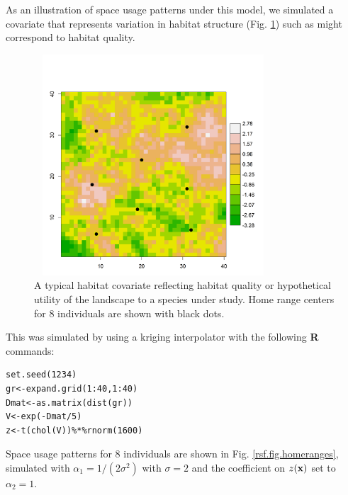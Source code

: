 As an illustration of space usage patterns under this model, we
simulated a covariate that represents variation in habitat structure
(Fig. \ref{rsf.fig.habitat}) such as might correspond to habitat
quality.
\begin{figure}
\centering
\includegraphics[width=3.5in,height=3.25in]{Ch10-RSF/figs/habitat.png}
\caption{A typical habitat covariate reflecting habitat quality or
  hypothetical utility of the landscape to a species under study. Home range centers for 8 individuals are
shown with black dots.}
\label{rsf.fig.habitat}
\end{figure}
This was simulated by using a
kriging interpolator with the following {\bf R} commands:
\begin{verbatim}
set.seed(1234)
gr<-expand.grid(1:40,1:40)
Dmat<-as.matrix(dist(gr))
V<-exp(-Dmat/5)
z<-t(chol(V))%*%rnorm(1600)
\end{verbatim}
Space usage patterns for
 8 individuals are shown in Fig. \ref{rsf.fig.homeranges},
simulated with $\alpha_{1} = 1/(2\sigma^2)$ with $\sigma = 2$ and the
coefficient on $z({\bf x})$ set to $\alpha_{2} = 1$.
